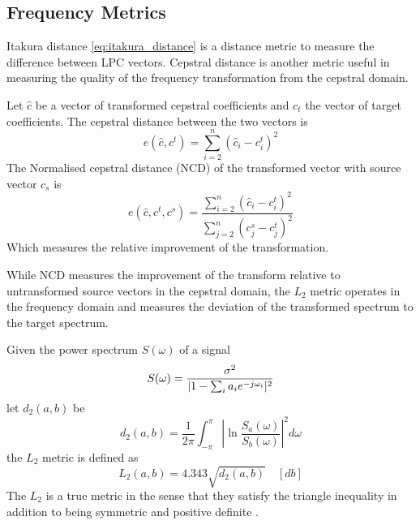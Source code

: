 \subsection{Frequency Metrics} %
\label{sub:frequency_metrics}
Itakura distance \eqref{eq:itakura_distance} is a distance metric to measure the difference between LPC vectors. Cepstral distance is another metric useful in measuring the quality of the frequency transformation from the cepstral domain. 
\begin{definition}
	Let $\hat{c}$ be a vector of transformed cepstral coefficients and $c_t$ the vector of target coefficients. The cepstral distance between the two vectors is
	\begin{equation}
		\label{eq:cepstral_distance}
		e(\hat{c},c^t) = \sum_{i=2}^{n}(\hat{c}_{i}-c_{i}^t)^2
	\end{equation}
	The Normalised cepstral distance (NCD) of the transformed vector with source vector $c_s$ is
	\begin{equation}
		\label{eq:ncd}
		e(\hat{c},c^t,c^s) = \frac{{\sum}_{i=2}^{n}(\hat{c}_{i}-c_{i}^t)^2}{\sum_{j=2}^{n}(c_{j}^s-c_{j}^t)^2}
	\end{equation}
	Which measures the relative improvement of the transformation.
\end{definition}

While NCD measures the improvement of the transform relative to untransformed source vectors in the cepstral domain, the $L_2$ metric operates in the frequency domain and measures the deviation of the transformed spectrum to the target spectrum.

\begin{definition}
	Given the power spectrum $S(\omega)$ of a signal
\begin{equation}
	S(\omega) = \frac{\sigma^2}{\lvert1-\sum_{i}a_i e^{-j\omega_i}\rvert^2}
\end{equation}
let $d_2(a,b)$ be 
\begin{equation}
	d_2(a,b) = \frac{1}{2\pi}\int_{-\pi}^{\pi}\left\lvert\ln \frac{S_a(\omega)}{S_b(\omega)}\right\rvert^2 d\omega
\end{equation}
the $L_2$ metric is defined as \cite{gray76}
\begin{equation}
	\label{eq:l2_metric}
	L_2(a,b)  = 4.343 \sqrt{d_2(a,b)} \quad [db]
\end{equation}
The $L_2$ is a true metric in the sense that they satisfy the triangle inequality in addition to being symmetric and positive definite \cite{kreyszig89}.
\end{definition}

